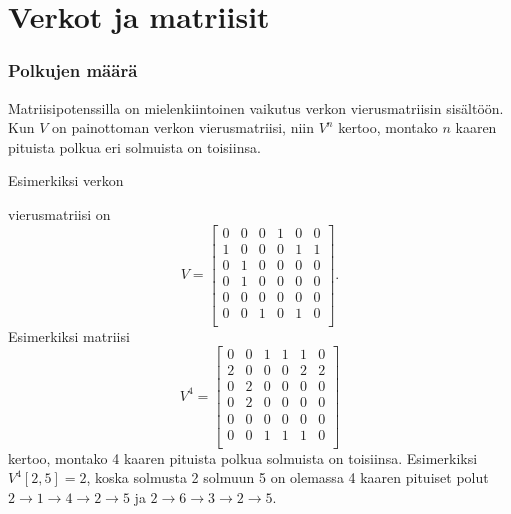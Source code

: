 \section{Verkot ja matriisit}

\subsubsection{Polkujen määrä}

Matriisipotenssilla
on mielenkiintoinen vaikutus
verkon vierusmatriisin sisältöön.
Kun $V$ on painottoman verkon vierusmatriisi,
niin $V^n$ kertoo,
montako $n$ kaaren pituista polkua
eri solmuista on toisiinsa.

Esimerkiksi verkon
\begin{center}
\end{center}
vierusmatriisi on
\[
V= \begin{bmatrix}
  0 & 0 & 0 & 1 & 0 & 0 \\
  1 & 0 & 0 & 0 & 1 & 1 \\
  0 & 1 & 0 & 0 & 0 & 0 \\
  0 & 1 & 0 & 0 & 0 & 0 \\
  0 & 0 & 0 & 0 & 0 & 0 \\
  0 & 0 & 1 & 0 & 1 & 0 \\
 \end{bmatrix}.
\]
Esimerkiksi matriisi
\[
V^4= \begin{bmatrix}
  0 & 0 & 1 & 1 & 1 & 0 \\
  2 & 0 & 0 & 0 & 2 & 2 \\
  0 & 2 & 0 & 0 & 0 & 0 \\
  0 & 2 & 0 & 0 & 0 & 0 \\
  0 & 0 & 0 & 0 & 0 & 0 \\
  0 & 0 & 1 & 1 & 1 & 0 \\
 \end{bmatrix}
\]
kertoo, montako 4 kaaren pituista polkua
solmuista on toisiinsa.
Esimerkiksi $V^4[2,5]=2$,
koska solmusta 2 solmuun 5 on olemassa
4 kaaren pituiset polut
$2 \rightarrow 1 \rightarrow 4 \rightarrow 2 \rightarrow 5$
ja 
$2 \rightarrow 6 \rightarrow 3 \rightarrow 2 \rightarrow 5$.

